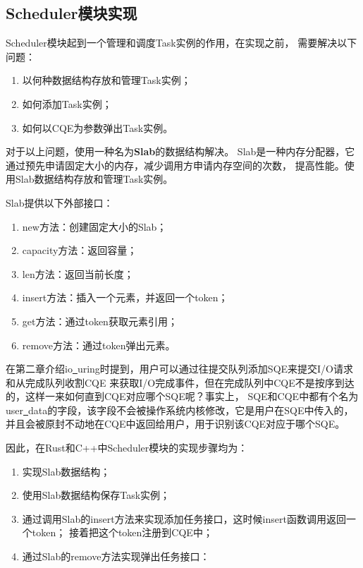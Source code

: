 \documentclass[supercite]{HustGraduPaper}
\newcommand*{\circled}[1]{\lower.7ex\hbox{\tikz\draw (0pt, 0pt)%
    circle (.5em) node {\makebox[1em][c]{\small #1}};}}
\theoremstyle{definition}
\begin{document}
\subsection{Scheduler模块实现}

Scheduler模块起到一个管理和调度Task实例的作用，在实现之前，
需要解决以下问题：

\begin{enumerate}[label={(\arabic*)}]
  \item 以何种数据结构存放和管理Task实例；
  \item 如何添加Task实例；
  \item 如何以CQE为参数弹出Task实例。
\end{enumerate}

对于以上问题，使用一种名为\textbf{Slab}的数据结构解决。
Slab是一种内存分配器，它通过预先申请固定大小的内存，减少调用方申请内存空间的次数，
提高性能。使用Slab数据结构存放和管理Task实例。\par

Slab提供以下外部接口：

\begin{enumerate}[label={(\arabic*)}]
  \item new方法：创建固定大小的Slab；
  \item capacity方法：返回容量；
  \item len方法：返回当前长度；
  \item insert方法：插入一个元素，并返回一个token；
  \item get方法：通过token获取元素引用；
  \item remove方法：通过token弹出元素。
\end{enumerate}

在第二章介绍io\underline{~}uring时提到，用户可以通过往提交队列添加SQE来提交I/O请求和从完成队列收割CQE
来获取I/O完成事件，但在完成队列中CQE不是按序到达的，这样一来如何直到CQE对应哪个SQE呢？事实上，
SQE和CQE中都有个名为user\underline{~}data的字段，该字段不会被操作系统内核修改，它是用户在SQE中传入的，
并且会被原封不动地在CQE中返回给用户，用于识别该CQE对应于哪个SQE。\par

因此，在Rust和C++中Scheduler模块的实现步骤均为：

\begin{enumerate}[label={(\arabic*)}]
  \item 实现Slab数据结构；
  \item 使用Slab数据结构保存Task实例；
  \item 通过调用Slab的insert方法来实现添加任务接口，这时候insert函数调用返回一个token；
    接着把这个token注册到CQE中；
  \item 通过Slab的remove方法实现弹出任务接口：
\end{enumerate}
\end{document}
